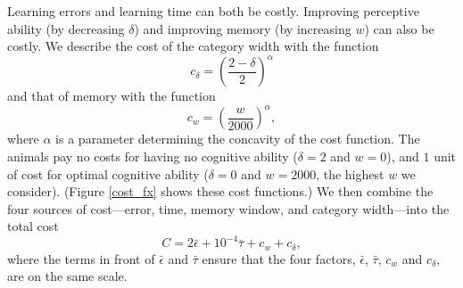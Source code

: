 Learning errors and learning time can both be costly. Improving  perceptive ability (by decreasing $\delta$) and improving memory (by increasing $w$) can also be costly. We describe the cost of the category width with the function
\begin{equation*}
c_\delta = \left(\frac{2-\delta}{2}\right)^\alpha
\end{equation*}
and that of memory with the function
\begin{equation*}
c_w = \left(\frac{w}{2000}\right)^\alpha,
\end{equation*}
where $\alpha$ is a parameter determining the concavity of the cost function. The animals pay no costs for having no cognitive ability ($\delta=2$ and $w=0$), and $1$ unit of cost for optimal cognitive ability ($\delta=0$ and $w=2000$, the highest $w$ we consider). (Figure \ref{cost_fx} shows these cost functions.)
We then combine the four sources of cost---error, time, memory window, and category width---into the total cost 
\begin{equation*}
C = 2\bar{\epsilon}+10^{-4}\bar{\tau}+c_w+c_\delta,
\end{equation*}
where the terms in front of $\bar{\epsilon}$ and $\bar{\tau}$ ensure that the four factors, $\bar{\epsilon}$, $\bar{\tau}$, $c_w$ and $c_\delta$, are on the same scale. 

